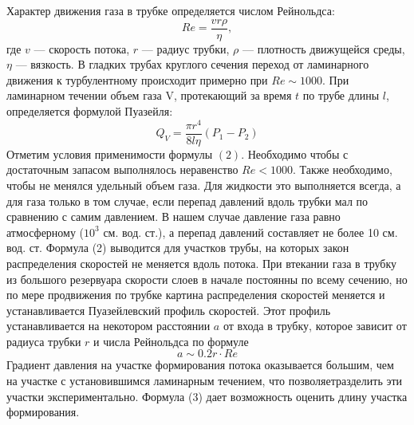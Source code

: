 \documentclass[a4paper,12pt]{article}
\begin{document}
		Характер движения газа в трубке определяется числом Рейнольдса:
		\begin{equation}
			Re = \frac{vr\rho}{\eta},
		\end{equation}
		где $v$ --- скорость потока, $r$ --- радиус трубки, $\rho$ --- плотность движущейся среды, $\eta$ --- вязкость. В гладких трубах круглого сечения переход от ламинарного движения к турбулентному происходит примерно при $Re \sim 1000$.
		При ламинарном течении объем газа V, протекающий за время $t$ по трубе длины $l$, определяется формулой Пуазейля:
		\begin{equation}
			Q_V = \frac{\pi r^4}{8l\eta}\left(P_1-P_2\right)
		\end{equation}
		Отметим условия применимости формулы $(2)$. Необходимо чтобы с достаточным запасом выполнялось неравенство $Re < 1000$. Также необходимо, чтобы не менялся удельный объем газа. Для жидкости это выполняется всегда, а для газа только в том случае, если перепад давлений вдоль трубки мал по сравнению с самим давлением. В нашем случае давление газа равно атмосферному ($10^3$ см. вод. ст.), а перепад давлений составляет не более 10 см. вод. ст. Формула (2) выводится для участков трубы, на которых закон распределения скоростей не меняется вдоль потока. При втекании газа в трубку из большого резервуара скорости слоев в начале постоянны по всему сечению, но по мере продвижения по трубке картина распределения скоростей меняется и устанавливается Пуазейлевский профиль скоростей. Этот профиль устанавливается на некотором расстоянии $a$ от входа в трубку, которое зависит от радиуса трубки $r$ и числа Рейнольдса по формуле
		\begin{equation}
			a \sim 0.2r\cdot Re
		\end{equation}
		Градиент давления на участке формирования потока оказывается большим, чем на участке с установившимся ламинарным течением, что позволяетразделить эти участки экспериментально. Формула (3) дает возможность оценить  длину участка формирования.
\end{document}
